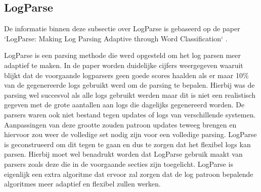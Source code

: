 \subsection{LogParse}
De informatie binnen deze subsectie over LogParse is gebaseerd op de paper `LogParse: Making Log Parsing Adaptive through Word Classification` \autocite{LogParse2020}. 

LogParse is een parsing methode die werd opgesteld om het log parsen meer adaptief te maken. In de paper worden duidelijke cijfers weergegeven waaruit blijkt dat de voorgaande logparsers geen goede scores haalden als er maar 10\% van de gegenereerde logs gebruikt werd om de parsing te bepalen. Hierbij was de parsing wel succesvol als alle logs gebruikt werden maar dit is niet een realistisch gegeven met de grote aantallen aan logs die dagelijks gegenereerd worden. De parsers waren ook niet bestand tegen updates of logs van verschillende systemen. Aanpassingen van deze grootte zouden patroon updates teweeg brengen en hiervoor zou weer de volledige set nodig zijn voor een volledige parsing. LogParse is geconstrueerd om dit tegen te gaan en dus te zorgen dat het flexibel logs kan parsen. Hierbij moet wel benadrukt worden dat LogParse gebruik maakt van parsers zoals deze die in de voorgaande secties zijn toegelicht. LogParse is eigenlijk een extra algoritme dat ervoor zal zorgen dat de log patroon bepalende algoritmes meer adaptief en flexibel zullen werken.\\

